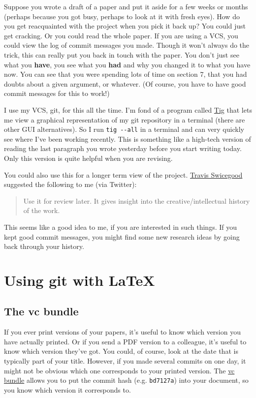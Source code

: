 \documentclass{article}
\begin{document}
Suppose you wrote a draft of a paper and put it aside for a few weeks 
or months (perhaps because you got busy, perhaps to look at it with 
fresh eyes). How do you get reacquainted with the project when you 
pick it back up? You could just get cracking. Or you could read the 
whole paper. If you are using a VCS, you could view the log of commit 
messages you made. Though it won't always do the trick, this can 
really put you back in touch with the paper. You don't just see what 
you \textbf{have}, you see what you \textbf{had} and why you changed 
it to what you have now. You can see that you were spending lots of 
time on section 7, that you had doubts about a given argument, or 
whatever. (Of course, you have to have good commit messages for this 
to work!)

I use my VCS, git, for this all the time. I'm fond of a program called 
\href{http://jonas.nitro.dk/tig/}{Tig} that lets me view a graphical 
representation of my git repository in a terminal (there are other GUI 
alternatives). So I run \lstinline!tig --all! in a terminal and can very 
quickly see where I've been working recently.  This is something like 
a high-tech version of reading the last paragraph you wrote yesterday 
before you start writing today. Only this version is quite helpful 
when you are revising.

You could also use this for a longer term view of the project.  
\href{http://www.travisswicegood.com/}{Travis Swicegood} suggested the 
following to me (via Twitter):

\begin{quote}
Use it for review later. It gives insight into the 
creative/intellectual history of the work.

\end{quote}
This seems like a good idea to me, if you are interested in such 
things. If you kept good commit messages, you might find some new 
research ideas by going back through your history.

\section{Using git with \LaTeX }

\subsection{The vc bundle}
If you ever print versions of your papers, it's useful to know which version
  you have actually printed.
Or if you send a PDF version to a colleague, it's useful to know which version they've got.
You could, of course, look at the date that is typically part of your title.
However, if you made several commits on one day, it might not be obvious which one corresponds to your printed version.
The \href{http://www.ctan.org/tex-archive/support/vc/}{vc bundle} allows you to
  put the commit hash (e.g. \lstinline!bd7127a!) into your document, so you know which version it corresponds to.
\end{document}
